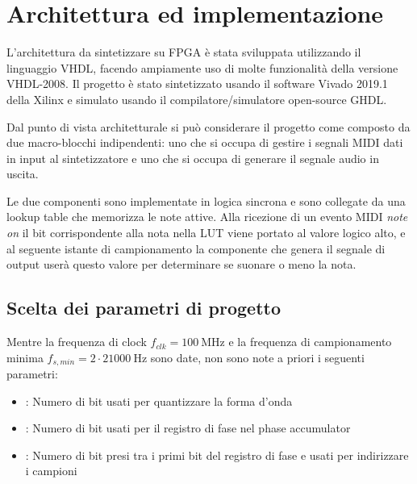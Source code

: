 \newcommand{\blockdiagram}[4]{
	\begin{tikzpicture}[font=\sffamily,>=triangle 45]
         \node [circuit] (item) {};
		
		\matrix[
		matrix of nodes,
		left= of item,
		row sep=\myheight/15,
		nodes={anchor=east}
		] (rightmatr) {
			#3
			\\
		};
		\matrix[
		matrix of nodes,
		right= of item,
		row sep=\myheight/15,
		nodes={anchor=west}
		] (leftmatr) {
			#4
			\\
		};
	
		\foreach \i in {1,...,#1}
			\draw [->] (rightmatr-\i-1) -- (rightmatr-\i-1 -| item.west);
		\foreach \i in {1,...,#2}
			\draw [<-] (leftmatr-\i-1) -- (leftmatr-\i-1 -| item.east);
	\end{tikzpicture}
}


\chapter{Architettura ed implementazione}

L'architettura da sintetizzare su FPGA è stata sviluppata utilizzando il linguaggio VHDL, facendo
ampiamente uso di molte funzionalità della versione VHDL-2008.
Il progetto è stato sintetizzato usando il software Vivado 2019.1 della Xilinx e simulato usando il compilatore/simulatore open-source GHDL.

Dal punto di vista architetturale si può considerare il progetto come composto da due macro-blocchi indipendenti: uno che si occupa di gestire i segnali MIDI dati in input al sintetizzatore e uno che si occupa di generare il segnale audio in uscita.

Le due componenti sono implementate in logica sincrona e sono collegate da una lookup table che memorizza le note attive. Alla ricezione di un evento MIDI \textit{note on} il bit corrispondente alla nota nella LUT viene portato al valore logico alto, e al seguente istante di campionamento la componente che genera il segnale di output userà questo valore per determinare se suonare o meno la nota.

\section{Scelta dei parametri di progetto}
Mentre la frequenza di clock $f_{clk} = \SI{100}{\mega\hertz}$ e 
la frequenza di campionamento minima $f_{s,min} = 2 \cdot \SI{21000}{\hertz}$
sono date, non sono note a priori i seguenti parametri:
\begin{itemize}
    \item \textbf{}: Numero di bit usati per quantizzare la forma d'onda
    \item \textbf{}: Numero di bit usati per il registro di fase nel phase accumulator
    \item \textbf{}: Numero di bit presi tra i primi bit del registro di fase e usati per indirizzare i campioni
\end{itemize}

